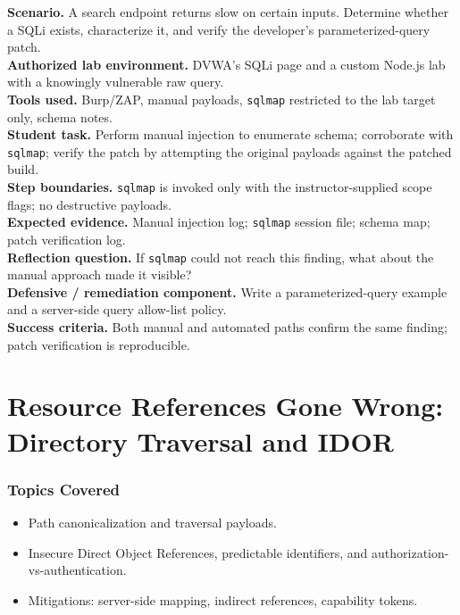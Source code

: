 \documentclass[11pt,letterpaper,oneside]{report}
\newcommand{\tool}[1]{\texttt{\small #1}}
\begin{document}
\begin{labbox}
\textbf{Scenario.} A search endpoint returns slow on certain inputs. Determine whether a SQLi exists, characterize it, and verify the developer's parameterized-query patch.\\[3pt]
\textbf{Authorized lab environment.} DVWA's SQLi page and a custom Node.js lab with a knowingly vulnerable raw query.\\[3pt]
\textbf{Tools used.} Burp/ZAP, manual payloads, \tool{sqlmap} restricted to the lab target only, schema notes.\\[3pt]
\textbf{Student task.} Perform manual injection to enumerate schema; corroborate with \tool{sqlmap}; verify the patch by attempting the original payloads against the patched build.\\[3pt]
\textbf{Step boundaries.} \tool{sqlmap} is invoked only with the instructor-supplied scope flags; no destructive payloads.\\[3pt]
\textbf{Expected evidence.} Manual injection log; \tool{sqlmap} session file; schema map; patch verification log.\\[3pt]
\textbf{Reflection question.} If \tool{sqlmap} could not reach this finding, what about the manual approach made it visible?\\[3pt]
\textbf{Defensive / remediation component.} Write a parameterized-query example and a server-side query allow-list policy.\\[3pt]
\textbf{Success criteria.} Both manual and automated paths confirm the same finding; patch verification is reproducible.
\end{labbox}

\chapter{Resource References Gone Wrong: Directory Traversal and IDOR}

\subsection*{Topics Covered}
\begin{itemize}
  \item Path canonicalization and traversal payloads.
  \item Insecure Direct Object References, predictable identifiers, and authorization-vs-authentication.
  \item Mitigations: server-side mapping, indirect references, capability tokens.
\end{itemize}
\end{document}
